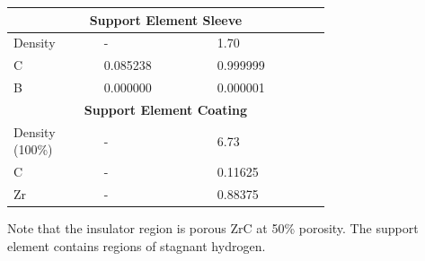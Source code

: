 \documentclass[8pt,a5paper]{article}
\begin{document}
\begin{longtable}{|m{0.2\linewidth}|m{0.25\linewidth}|m{0.25\linewidth}|}
    \multicolumn{3}{|c|}{\textbf{Support Element Sleeve}}\\\hline
    Density & - & \SI{1.70}{} \\
    C & \SI{0.085238}{} & \SI{0.999999}{} \\
    B & \SI{0.000000}{} & \SI{0.000001}{} \\\hline
    \multicolumn{3}{|c|}{\textbf{Support Element Coating}}\\\hline
    Density (100\%) & - & \SI{6.73}{} \\
    C & - & \SI{0.11625}{} \\
    Zr & - & \SI{0.88375}{} \\
\end{longtable}

Note that the insulator region is porous ZrC at 50\% porosity. The support
element contains regions of stagnant hydrogen.
\end{document}
